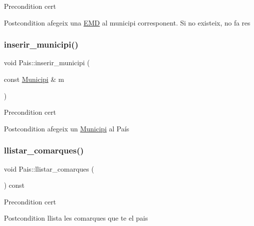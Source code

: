 \begin{DoxyPrecond}{Precondition}
cert 
\end{DoxyPrecond}
\begin{DoxyPostcond}{Postcondition}
afegeix una \hyperlink{classEMD}{E\+MD} al municipi corresponent. Si no existeix, no fa res 
\end{DoxyPostcond}
\mbox{\label{classPais_a3f5ad8b10ce4adcd5e0701ca18b3d10d}} 
\subsubsection{\texorpdfstring{inserir\+\_\+municipi()}{inserir\_municipi()}}
{\footnotesize\ttfamily void Pais\+::inserir\+\_\+municipi (\begin{DoxyParamCaption}\item[{const \hyperlink{classMunicipi}{Municipi} \&}]{m }\end{DoxyParamCaption})}

\begin{DoxyPrecond}{Precondition}
cert 
\end{DoxyPrecond}
\begin{DoxyPostcond}{Postcondition}
afegeix un \hyperlink{classMunicipi}{Municipi} al País 
\end{DoxyPostcond}
\mbox{\label{classPais_a246084dd38da8773d7beb428af235234}} 
\subsubsection{\texorpdfstring{llistar\+\_\+comarques()}{llistar\_comarques()}}
{\footnotesize\ttfamily void Pais\+::llistar\+\_\+comarques (\begin{DoxyParamCaption}{ }\end{DoxyParamCaption}) const}

\begin{DoxyPrecond}{Precondition}
cert 
\end{DoxyPrecond}
\begin{DoxyPostcond}{Postcondition}
llista les comarques que te el pais 
\end{DoxyPostcond}
\mbox{\label{classPais_a21a52a69fa3a93474ba9c63caab0772a}} 

